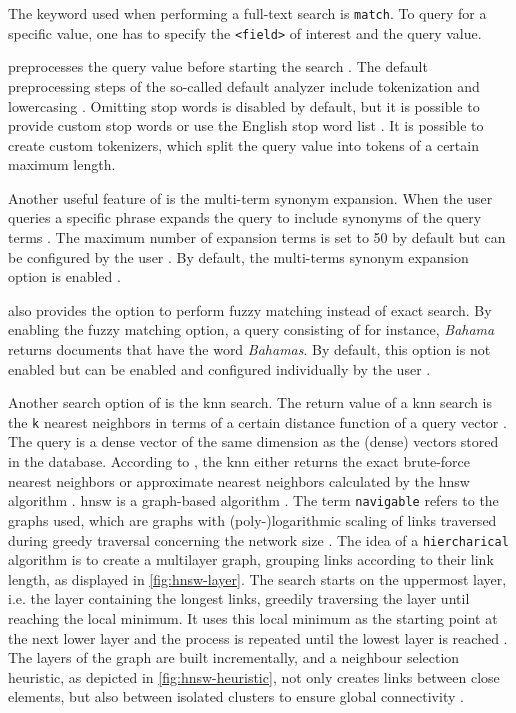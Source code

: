 The keyword used when performing a full-text search is \texttt{match}.
To query for a specific value, one has to specify the \texttt{<field>} of interest and the query value.

\databaseName{} preprocesses the query value before starting the search \cite{Elasticsearch-text-analyser}.
The default preprocessing steps of the so-called default analyzer include tokenization and lowercasing \cite{Elasticsearch-text-analyser}. 
Omitting stop words is disabled by default, but it is possible to provide custom stop words or use the English stop word list \cite{Elasticsearch-text-analyser}.
It is possible to create custom tokenizers, which split the query value into tokens of a certain maximum length.

Another useful feature of \databaseName{} is the multi-term synonym expansion.
When the user queries a specific phrase \databaseName{} expands the query to include synonyms of the query terms \cite{Elasticsearch-synonyms}.
The maximum number of expansion terms is set to 50 by default but can be configured by the user \cite{Elasticsearch-match}.
By default, the multi-terms synonym expansion option is enabled \cite{Elasticsearch-match}.

\databaseName{} also provides the option to perform fuzzy matching instead of exact search.
By enabling the fuzzy matching option, a \databaseName{} query consisting of for instance, \textit{Bahama} returns documents that have the word \textit{Bahamas}.
By default, this option is not enabled but can be enabled and configured individually by the user \cite{Elasticsearch-match}.


Another search option of \databaseName{} is the \ac{knn} search.
The return value of a \ac{knn} search is the \texttt{k} nearest neighbors in terms of a certain distance function of a query vector \cite{Elasticsearch-kNN-HNSW}.
The query is a dense vector of the same dimension as the (dense) vectors stored in the database.
According to \cite{Elasticsearch-knn}, the \ac{knn} either returns the exact brute-force nearest neighbors or approximate nearest neighbors calculated by the \ac{hnsw} algorithm \cite{Elasticsearch-kNN-HNSW, Elasticsearch-knn}.
\ac{hnsw} is a graph-based algorithm \cite{Elasticsearch-kNN-HNSW}.
The term \texttt{navigable} refers to the graphs used, which are graphs with (poly-)logarithmic scaling of links traversed during greedy traversal concerning the network size \cite{Elasticsearch-kNN-HNSW}.
The idea of a \texttt{hiercharical} algorithm is to create a multilayer graph, grouping links according to their link length, as displayed in \autoref{fig:hnsw-layer}. 
The search starts on the uppermost layer, i.e. the layer containing the longest links, greedily traversing the layer until reaching the local minimum.
It uses this local minimum as the starting point at the next lower layer and the process is repeated until the lowest layer is reached \cite{Elasticsearch-kNN-HNSW}.
The layers of the graph are built incrementally, and a neighbour selection heuristic, as depicted in \autoref{fig:hnsw-heuristic}, not only creates links between close elements, 
but also between isolated clusters to ensure global connectivity \cite{Elasticsearch-kNN-HNSW}.


